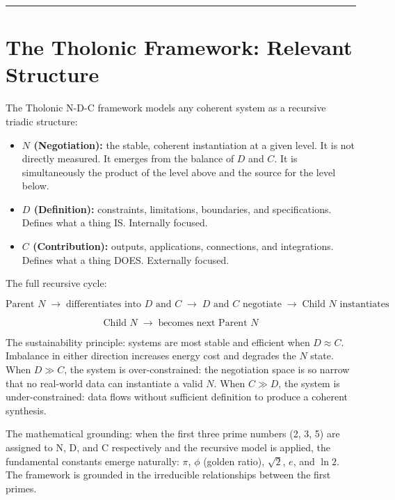 \documentclass[12pt]{article}
\providecommand{\tightlist}{%
  \setlength{\itemsep}{0pt}\setlength{\parskip}{0pt}}
\begin{document}
\begin{center}\rule{0.5\linewidth}{0.5pt}\end{center}

\section{The Tholonic Framework: Relevant Structure}\label{the-tholonic-framework-relevant-structure}

The Tholonic N-D-C framework models any coherent system as a recursive
triadic structure:

\begin{itemize}
\tightlist
\item
  \textbf{\(N\) (Negotiation):} the stable, coherent instantiation at a
  given level. It is not directly measured. It emerges from the balance
  of \(D\) and \(C\). It is simultaneously the product of the level
  above and the source for the level below.
\item
  \textbf{\(D\) (Definition):} constraints, limitations, boundaries, and
  specifications. Defines what a thing IS. Internally focused.
\item
  \textbf{\(C\) (Contribution):} outputs, applications, connections, and
  integrations. Defines what a thing DOES. Externally focused.
\end{itemize}

The full recursive cycle:

\[\text{Parent } N \;\to\; \text{differentiates into } D \text{ and } C \;\to\; D \text{ and } C \text{ negotiate} \;\to\; \text{Child } N \text{ instantiates}\]

\[\text{Child } N \;\to\; \text{becomes next Parent } N\]

The sustainability principle: systems are most stable and efficient when
\(D \approx C\). Imbalance in either direction increases energy cost and
degrades the \(N\) state. When \(D \gg C\), the system is
over-constrained: the negotiation space is so narrow that no real-world
data can instantiate a valid \(N\). When \(C \gg D\), the system is
under-constrained: data flows without sufficient definition to produce a
coherent synthesis.

The mathematical grounding: when the first three prime numbers (2, 3, 5)
are assigned to N, D, and C respectively and the recursive model is
applied, the fundamental constants emerge naturally: \(\pi\), \(\phi\)
(golden ratio), \(\sqrt{2}\), \(e\), and \(\ln 2\). The framework is
grounded in the irreducible relationships between the first primes.
\end{document}

